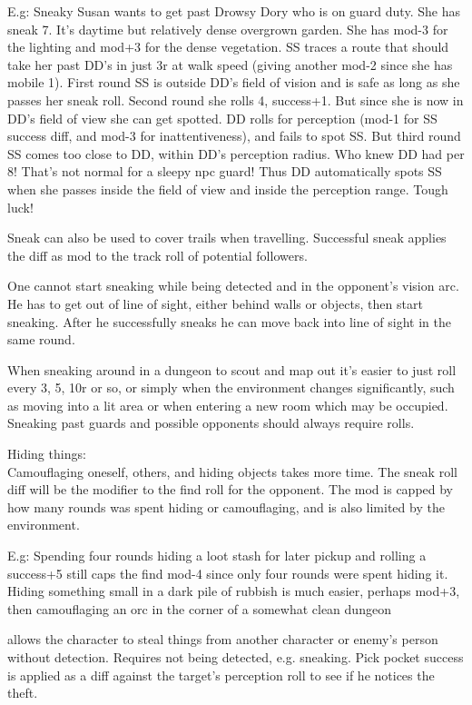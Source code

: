 E.g: Sneaky Susan wants to get past Drowsy Dory who is on guard duty. She has sneak 7. It's daytime but relatively dense overgrown garden. She has mod-3 for the lighting and mod+3 for the dense vegetation. SS traces a route that should take her past DD's in just 3r at walk speed (giving another mod-2 since she has mobile 1). First round SS is outside DD's field of vision and is safe as long as she passes her sneak roll. Second round she rolls 4, success+1. But since she is now in DD's field of view she can get spotted. DD rolls for perception (mod-1 for SS success diff, and mod-3 for inattentiveness), and fails to spot SS. But third round SS comes too close to DD, within DD's perception radius. Who knew DD had per 8! That's not normal for a sleepy npc guard! Thus DD automatically spots SS when she passes inside the field of view and inside the perception range. Tough luck!

Sneak can also be used to cover trails when travelling. Successful sneak applies the diff as mod to the track roll of potential followers.

One cannot start sneaking while being detected and in the opponent's vision arc. He has to get out of line of sight, either behind walls or objects, then start sneaking. After he successfully sneaks he can move back into line of sight in the same round.

When sneaking around in a dungeon to scout and map out it's easier to just roll every 3, 5, 10r or so, or simply when the environment changes significantly, such as moving into a lit area or when entering a new room which may be occupied. Sneaking past guards and possible opponents should always require rolls.

Hiding things:\\
Camouflaging oneself, others, and hiding objects takes more time. The sneak roll diff will be the modifier to the find roll for the opponent. The mod is capped by how many rounds was spent hiding or camouflaging, and is also limited by the environment.

E.g: Spending four rounds hiding a loot stash for later pickup and rolling a success+5 still caps the find mod-4 since only four rounds were spent hiding it.
Hiding something small in a dark pile of rubbish is much easier, perhaps mod+3, then camouflaging an orc in the corner of a somewhat clean dungeon


 allows the character to steal things from another character or enemy's person without detection. Requires not being detected, e.g. sneaking. Pick pocket success is applied as a diff against the target's perception roll to see if he notices the theft.

